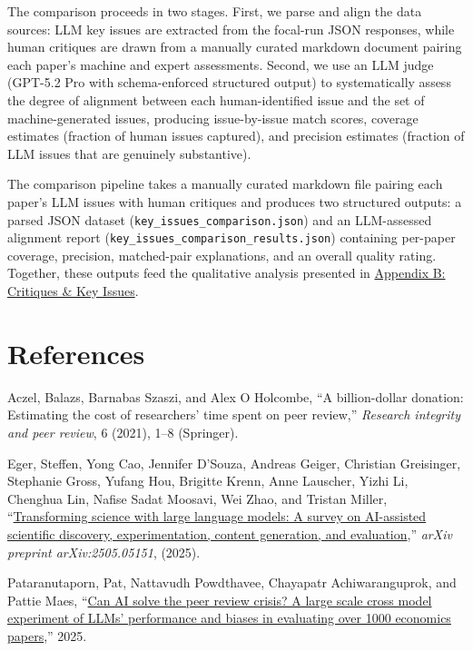 \documentclass[
  11pt,
  letterpaper,
]{article}
\newlength{\cslhangindent}
\newenvironment{CSLReferences}[2] %
 {\begin{list}{}{%
  \setlength{\itemindent}{0pt}
  \setlength{\leftmargin}{0pt}
  \setlength{\parsep}{0pt}
  \ifodd #1
   \setlength{\leftmargin}{\cslhangindent}
   \setlength{\itemindent}{-1\cslhangindent}
  \fi
  \setlength{\itemsep}{#2\baselineskip}}}
 {\end{list}}
\begin{document}
The comparison proceeds in two stages. First, we parse and align the
data sources: LLM key issues are extracted from the focal-run JSON
responses, while human critiques are drawn from a manually curated
markdown document pairing each paper's machine and expert assessments.
Second, we use an LLM judge (GPT-5.2 Pro with schema-enforced structured
output) to systematically assess the degree of alignment between each
human-identified issue and the set of machine-generated issues,
producing issue-by-issue match scores, coverage estimates (fraction of
human issues captured), and precision estimates (fraction of LLM issues
that are genuinely substantive).

The comparison pipeline takes a manually curated markdown file pairing
each paper's LLM issues with human critiques and produces two structured
outputs: a parsed JSON dataset (\texttt{key\_issues\_comparison.json})
and an LLM-assessed alignment report
(\texttt{key\_issues\_comparison\_results.json}) containing per-paper
coverage, precision, matched-pair explanations, and an overall quality
rating. Together, these outputs feed the qualitative analysis presented
in \href{results_critiques.qmd}{Appendix B: Critiques \& Key Issues}.

\normalsize


\section*{References}\label{references}


\label{refs}
\begin{CSLReferences}{1}{0}
Aczel, Balazs, Barnabas Szaszi, and Alex O Holcombe, {``A billion-dollar
donation: Estimating the cost of researchers' time spent on peer
review,''} \emph{Research integrity and peer review}, 6 (2021), 1--8
(Springer).

Eger, Steffen, Yong Cao, Jennifer D'Souza, Andreas Geiger, Christian
Greisinger, Stephanie Gross, Yufang Hou, Brigitte Krenn, Anne Lauscher,
Yizhi Li, Chenghua Lin, Nafise Sadat Moosavi, Wei Zhao, and Tristan
Miller, {``\href{https://arxiv.org/abs/2502.05151}{Transforming science
with large language models: A survey on AI-assisted scientific
discovery, experimentation, content generation, and evaluation},''}
\emph{arXiv preprint arXiv:2505.05151}, (2025).

Pataranutaporn, Pat, Nattavudh Powdthavee, Chayapatr Achiwaranguprok,
and Pattie Maes,
{``\href{https://api.semanticscholar.org/CorpusID:277510314}{Can AI
solve the peer review crisis? A large scale cross model experiment of
LLMs' performance and biases in evaluating over 1000 economics
papers},''} 2025.

\end{CSLReferences}
\end{document}
